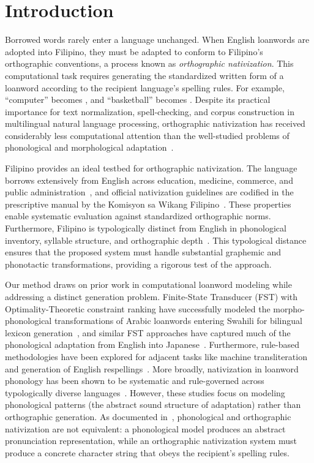 \section{Introduction}

Borrowed words rarely enter a language unchanged. When English loanwords are
adopted into Filipino, they must be adapted to conform to Filipino's
orthographic conventions, a process known as \emph{orthographic nativization}.
This computational task requires generating the standardized written form of a
loanword according to the recipient language's spelling rules. For example,
``computer'' becomes , and ``basketball'' becomes .
Despite its practical importance for text normalization, spell-checking, and
corpus construction in multilingual natural language processing, orthographic
nativization has received considerably less computational attention than the
well-studied problems of phonological and morphological
adaptation~\cite{kang2011,uffmann2015,wang2025,daland2015}.

Filipino provides an ideal testbed for orthographic nativization. The language
borrows extensively from English across education, medicine, commerce, and
public administration~\cite{martin2020,baklanova2017}, and official
nativization guidelines are codified in the prescriptive manual by the Komisyon
sa Wikang Filipino~\cite{almario2014}. These properties enable systematic
evaluation against standardized orthographic norms. Furthermore, Filipino is
typologically distinct from English in phonological inventory, syllable
structure, and orthographic depth~\cite{llamzon1966,schachter1972,llamzon1997}.
This typological distance ensures that the proposed system must handle
substantial graphemic and phonotactic transformations, providing a rigorous
test of the approach.

Our method draws on prior work in computational loanword modeling while
addressing a distinct generation problem. Finite-State Transducer (FST) with
Optimality-Theoretic constraint ranking have successfully modeled the
morpho-phonological transformations of Arabic loanwords entering Swahili for
bilingual lexicon generation~\cite{tsvetkov2015}, and similar FST approaches
have captured much of the phonological adaptation from English into
Japanese~\cite{mao2016}. Furthermore, rule-based methodologies have been
explored for adjacent tasks like machine transliteration and generation of
English respellings~\cite{syauqi2025,hauer2013}. More broadly, nativization in
loanword phonology has been shown to be systematic and rule-governed across
typologically diverse languages~\cite{kang2011}. However, these studies focus
on modeling phonological patterns (the abstract sound structure of adaptation)
rather than orthographic generation. As documented
in~\cite{wang2025,daland2015}, phonological and orthographic nativization are
not equivalent: a phonological model produces an abstract pronunciation
representation, while an orthographic nativization system must produce a
concrete character string that obeys the recipient's spelling rules.

